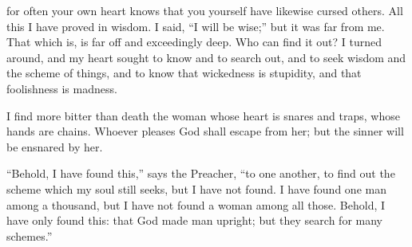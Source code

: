 {for often your own heart knows that you yourself have likewise cursed others.
All this I have proved in wisdom. I said, “I will be wise;” but it was far from me.
That which is, is far off and exceedingly deep. Who can find it out?
I turned around, and my heart sought to know and to search out, and to seek wisdom and the scheme of things, and to know that wickedness is stupidity, and that foolishness is madness.
\par }{\PP {}I find more bitter than death the woman whose heart is snares and traps, whose hands are chains. Whoever pleases God shall escape from her; but the sinner will be ensnared by her.
\par }{\PP {}“Behold, I have found this,” says the Preacher, “to one another, to find out the scheme
which my soul still seeks, but I have not found. I have found one man among a thousand, but I have not found a woman among all those.
Behold, I have only found this: that God made man upright; but they search for many schemes.”

}
